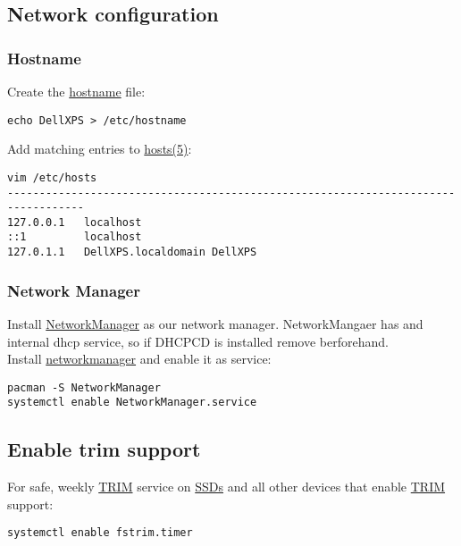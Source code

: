 \documentclass[12pt,A4]{article}
\begin{document}
\subsection{Network configuration}
\subsubsection{Hostname}
Create the \href{https://wiki.archlinux.org/index.php/Hostname}{hostname} file:
\begin{verbatim}
echo DellXPS > /etc/hostname
\end{verbatim}
Add matching entries to \href{https://jlk.fjfi.cvut.cz/arch/manpages/man/hosts.5}{hosts(5)}:
\begin{verbatim}
vim /etc/hosts
----------------------------------------------------------------------------------
127.0.0.1   localhost
::1         localhost
127.0.1.1   DellXPS.localdomain	DellXPS
\end{verbatim}
\subsubsection{Network Manager}
Install \href{https://wiki.archlinux.org/index.php/NetworkManager}{NetworkManager} as our network manager. NetworkMangaer has and internal dhcp service, so if DHCPCD is installed remove berforehand. \\
Install \href{https://wiki.archlinux.org/index.php/NetworkManager}{networkmanager} and enable it as service:
\begin{verbatim}
pacman -S NetworkManager
systemctl enable NetworkManager.service
\end{verbatim}

\subsection{Enable trim support}
For safe, weekly \href{https://wiki.archlinux.org/index.php/Solid_state_drive#TRIM}{TRIM} service on \href{https://wiki.archlinux.org/index.php/Solid_state_drive}{SSDs} and all other devices that enable \href{https://wiki.archlinux.org/index.php/Solid_state_drive#TRIM}{TRIM} support:
\begin{verbatim}
systemctl enable fstrim.timer
\end{verbatim}
\end{document}

